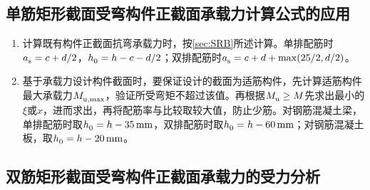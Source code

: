 \documentclass{article}
\begin{document}
\subsection{单筋矩形截面受弯构件正截面承载力计算公式的应用}
\begin{enumerate}
      \item 计算既有构件正截面抗弯承载力时，按\cref{sec:SRB}所述计算。单排配筋时$\script{a}{s}=c+d/2$，$\script{h}{0}=h-c-d/2$；双排配筋时$\script{a}{s}=c+d+\max(25/2, d/2)$。
      \item 基于承载力设计构件截面时，要保证设计的截面为适筋构件，先计算适筋构件最大承载力$\script{M}{u,max}$，验证所受弯矩不超过该值。再根据$\script{M}{u}\ge{}M$先求出最小的$\xi$或$x$，进而求出，再将配筋率与比较取较大值，防止少筋。对钢筋混凝土梁，单排配筋时取$\script{h}{0}=h-\SI{35}{\mm}$，双排配筋时取$\script{h}{0}=h-\SI{60}{\mm}$；对钢筋混凝土板，取$\script{h}{0}=h-\SI{20}{\mm}$。
\end{enumerate}
\subsection{双筋矩形截面受弯构件正截面承载力的受力分析}
\end{document}

